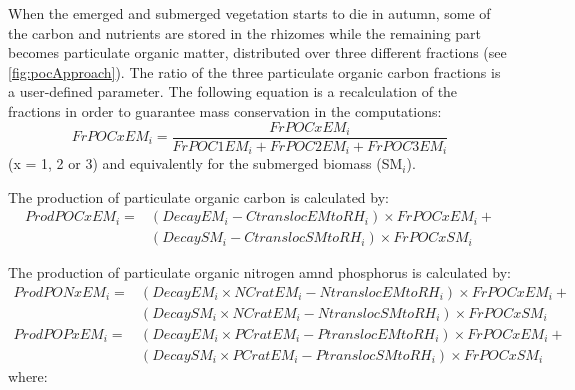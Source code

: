 When the emerged and submerged vegetation starts to die in autumn, some of the carbon and nutrients are stored in the rhizomes while the remaining part becomes particulate organic matter, distributed over three different fractions (see \autoref{fig:pocApproach}).
The ratio of the three particulate organic carbon fractions is a user-defined parameter.
The following equation is a recalculation of the fractions in order to guarantee mass conservation in the computations:
%
\begin{equation}
  FrPOCxEM_i = \frac{FrPOCxEM_i}{FrPOC1EM_i + FrPOC2EM_i + FrPOC3EM_i}
\end{equation}
%
(x = 1, 2 or 3) and equivalently for the submerged biomass (SM$_i$).

The production of particulate organic carbon is calculated by:
%
\begin{align}
\nonumber   ProdPOCxEM_i = &(DecayEM_i - CtranslocEMtoRH_i) \times FrPOCxEM_i + \\
                           &(DecaySM_i - CtranslocSMtoRH_i) \times FrPOCxSM_i
\end{align}

The production of particulate organic nitrogen amnd phosphorus is calculated by:
%
\begin{align}
\nonumber  ProdPONxEM_i = &(DecayEM_i \times NCratEM_i - NtranslocEMtoRH_i) \times FrPOCxEM_i + \\
\nonumber                 &(DecaySM_i \times NCratEM_i - NtranslocSMtoRH_i) \times FrPOCxSM_i   \\
\nonumber  ProdPOPxEM_i = &(DecayEM_i \times PCratEM_i - PtranslocEMtoRH_i) \times FrPOCxEM_i + \\
                          &(DecaySM_i \times PCratEM_i - PtranslocSMtoRH_i) \times FrPOCxSM_i
\end{align}
%
where:

